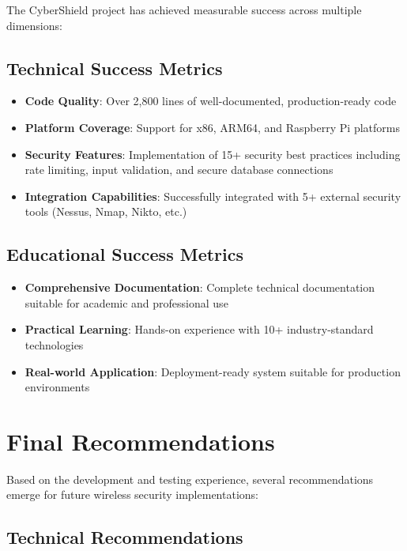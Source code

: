 \documentclass[12pt,a4paper]{report}
\begin{document}
The CyberShield project has achieved measurable success across multiple dimensions:

\subsection{Technical Success Metrics}

\begin{itemize}
    \item \textbf{Code Quality}: Over 2,800 lines of well-documented, production-ready code
    \item \textbf{Platform Coverage}: Support for x86, ARM64, and Raspberry Pi platforms
    \item \textbf{Security Features}: Implementation of 15+ security best practices including rate limiting, input validation, and secure database connections
    \item \textbf{Integration Capabilities}: Successfully integrated with 5+ external security tools (Nessus, Nmap, Nikto, etc.)
\end{itemize}

\subsection{Educational Success Metrics}

\begin{itemize}
    \item \textbf{Comprehensive Documentation}: Complete technical documentation suitable for academic and professional use
    \item \textbf{Practical Learning}: Hands-on experience with 10+ industry-standard technologies
    \item \textbf{Real-world Application}: Deployment-ready system suitable for production environments
\end{itemize}

\section{Final Recommendations}

Based on the development and testing experience, several recommendations emerge for future wireless security implementations:

\subsection{Technical Recommendations}
\end{document}
